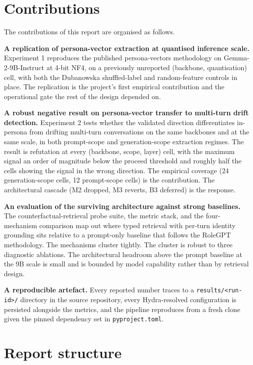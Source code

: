 \section{Contributions}

The contributions of this report are organised as follows.

\textbf{A replication of persona-vector extraction at quantised inference scale.} Experiment 1 reproduces the published persona-vectors methodology on Gemma-2-9B-Instruct at 4-bit NF4, on a previously unreported (backbone, quantisation) cell, with both the Dubanowska shuffled-label and random-feature controls in place. The replication is the project's first empirical contribution and the operational gate the rest of the design depended on.

\textbf{A robust negative result on persona-vector transfer to multi-turn drift detection.} Experiment 2 tests whether the validated direction differentiates in-persona from drifting multi-turn conversations on the same backbones and at the same scale, in both prompt-scope and generation-scope extraction regimes. The result is refutation at every (backbone, scope, layer) cell, with the maximum signal an order of magnitude below the proceed threshold and roughly half the cells showing the signal in the wrong direction. The empirical coverage (24 generation-scope cells, 12 prompt-scope cells) is the contribution. The architectural cascade (M2 dropped, M3 reverts, B3 deferred) is the response.

\textbf{An evaluation of the surviving architecture against strong baselines.} The counterfactual-retrieval probe suite, the metric stack, and the four-mechanism comparison map out where typed retrieval with per-turn identity grounding sits relative to a prompt-only baseline that follows the RoleGPT methodology. The mechanisms cluster tightly. The cluster is robust to three diagnostic ablations. The architectural headroom above the prompt baseline at the 9B scale is small and is bounded by model capability rather than by retrieval design.

\textbf{A reproducible artefact.} Every reported number traces to a \texttt{results/<run-id>/} directory in the source repository, every Hydra-resolved configuration is persisted alongside the metrics, and the pipeline reproduces from a fresh clone given the pinned dependency set in \texttt{pyproject.toml}.

\section{Report structure}

